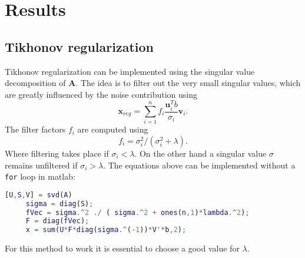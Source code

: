 \section{Results}
\subsection{Tikhonov regularization}
Tikhonov regularization can be implemented using the singular value decomposition of $\mathbf{A}$. The idea is to filter out the very small singular values, which are greatly influenced by the noise contribution using
\begin{equation}
\mathbf{x}_{reg} = \sum_{i=1}^{n}f_i \frac{\mathbf{u}_{i}^T b}{\sigma_i}\mathbf{v}_{i} .
\label{eq:tikh}
\end{equation}
The filter factors $f_i$ are computed using
\begin{equation}
f_i = \sigma_i^2/(\sigma_i^2 + \lambda).
\label{eq:filter}
\end{equation}
Where filtering takes place if $\sigma_i < \lambda$. On the other hand a singular value $\sigma$ remains unfiltered if $\sigma_i > \lambda$. 
The equations above can be implemented without a \texttt{for} loop in matlab:
\begin{lstlisting}[language=matlab]
     [U,S,V] = svd(A)
     sigma = diag(S);
     fVec = sigma.^2 ./ ( sigma.^2 + ones(n,1)*lambda.^2);
     F = diag(fVec);
     x = sum(U*F*diag(sigma.^(-1))*V'*b,2);
\end{lstlisting}
For this method to work it is essential to choose a good value for $\lambda$. 
